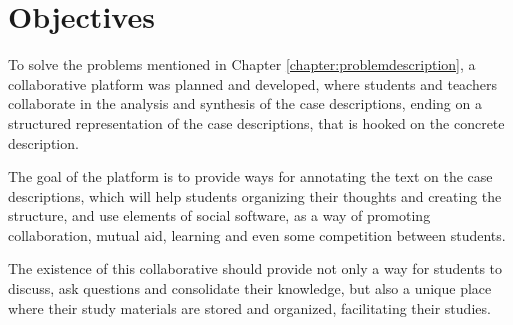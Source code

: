 
\chapter{Objectives}
\label{chapter:objectives}

To solve the problems mentioned in Chapter \ref{chapter:problemdescription}, a collaborative platform was planned and developed, where students and teachers collaborate in the analysis and synthesis of the case descriptions, ending on a structured representation of the case descriptions, that is hooked on the concrete description. 

The goal of the platform is to provide ways for annotating the text on the case descriptions, which will help students organizing their thoughts and creating the structure, and use elements of social software, as a way of promoting collaboration, mutual aid, learning and even some competition between students.
 
The existence of this collaborative should provide not only a way for students to discuss, ask questions and consolidate their knowledge, but also a unique place where their study materials are stored and organized, facilitating their studies.
